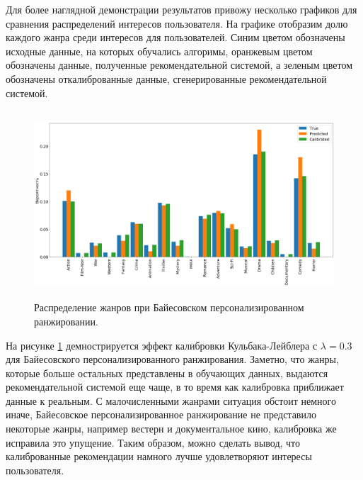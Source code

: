 Для более наглядной демонстрации результатов привожу несколько графиков для сравнения распределений интересов пользователя.
На графике отобразим долю каждого жанра среди интересов для пользователей. 
Синим цветом обозначены исходные данные, на которых обучались алгоримы,
оранжевым цветом обозначены данные, полученные рекомендательной системой,
а зеленым цветом обозначены откалиброванные данные, сгенерированные рекомендательной системой.
\begin{figure}[ht]
   \begin{flushleft}
      \includegraphics[width=15cm, height=7cm]{images/bay.png}
   
   \caption{
   \label{graph-KL}
        Распределение жанров при Байесовском персонализированном ранжировании.}
   \end {flushleft}

   \end {figure}


На рисунке \ref{graph-KL} демнострируется эффект калибровки Кульбака-Лейблера с ${\lambda=0.3}$ для Байесовского персонализированного ранжирования.
Заметно, что жанры, которые больше остальных представлены в обучающих данных, выдаются рекомендательной системой еще чаще,
в то время как калибровка приближает данные к реальным. С малочисленными жанрами ситуация обстоит немного иначе,
Байесовское персонализированное ранжирование не представило некоторые жанры, например вестерн и документальное кино, калибровка же
исправила это упущение. Таким образом, можно сделать вывод, что калиброванные рекомендации
намного лучше удовлетворяют интересы пользователя.



